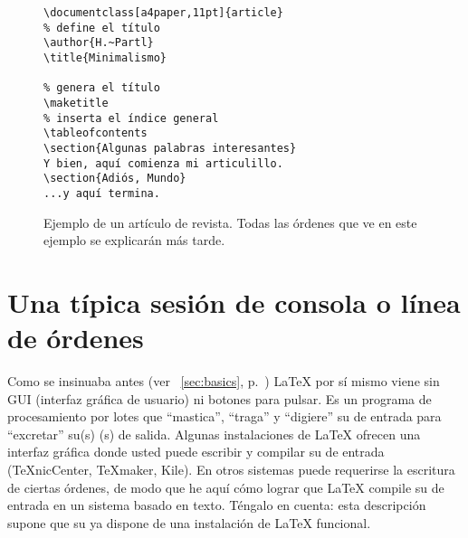 \begin{figure}[!bp]
\begin{lined}{10cm}
\begin{verbatim}
\documentclass[a4paper,11pt]{article}
% define el título
\author{H.~Partl}
\title{Minimalismo}

% genera el título
\maketitle 
% inserta el índice general
\tableofcontents
\section{Algunas palabras interesantes}
Y bien, aquí comienza mi articulillo.
\section{Adiós, Mundo}
...y aquí termina.

\end{verbatim}
\end{lined}
\caption[Ejemplo de un artículo de revista.]{Ejemplo de un artículo de revista.  Todas las órdenes que ve en este ejemplo se explicarán más tarde.}
\label{document}
\end{figure}

\section{Una típica sesión de consola o línea de órdenes}

Como se insinuaba antes (ver~ \ref{sec:basics}, p.~\pageref{sec:basics}) \LaTeX{} por sí mismo viene sin GUI (interfaz gráfica de usuario) ni botones para pulsar.  Es un programa de procesamiento por lotes que ``mastica'', ``traga'' y ``digiere'' su \filenomo{} de entrada para ``excretar'' su(s) \filenomo{}(s) de salida. Algunas instalaciones de \LaTeX{} ofrecen una interfaz gráfica donde usted puede escribir y compilar su \filenomo{} de entrada (\TeX{}nicCenter, \TeX{}maker, Kile).  En otros sistemas puede requerirse la escritura de ciertas órdenes, de modo que he aquí cómo lograr que \LaTeX{} compile su \filenomo{} de entrada en un sistema basado en texto.  Téngalo en cuenta: esta descripción supone que su \computernomo{} ya dispone de una instalación de \LaTeX{} funcional.

